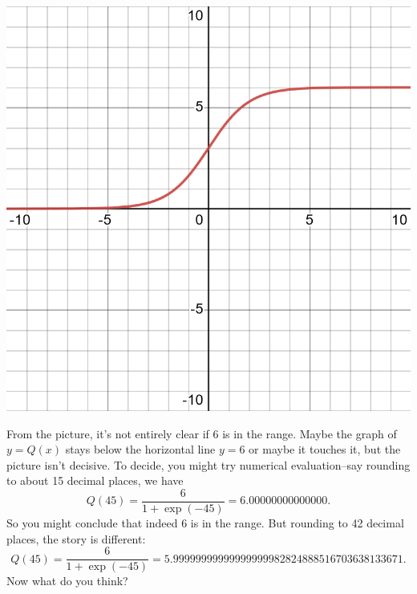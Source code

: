 \documentclass[12pt,fleqn,answers]{exam}
\begin{document}
\begin{questions}
\begin{solution}[3.5in]
\begin{center}
\includegraphics[scale=0.15]{desmos-graph(26).png}
\end{center}
From the picture, it's not entirely clear if $6$ is in the range. Maybe the graph of $y=Q(x)$ stays below the horizontal line
\mbox{$y=6$} or maybe it touches it, but the picture isn't decisive. To decide, you might try
numerical evaluation--say rounding to about 15 decimal places, we have
\begin{equation*}
    Q(45) = \frac{6}{1+\exp(-45)} = 6.00000000000000.
\end{equation*}
So you might conclude that indeed $6$ is in the range. But rounding to 42 decimal
places, the story is different:
\begin{equation*}
    Q(45) = \frac{6}{1+\exp(-45)} = 5.99999999999999999982824888516703638133671.
\end{equation*}
Now what do you think?


\end{solution}
\end{questions}
\end{document}

